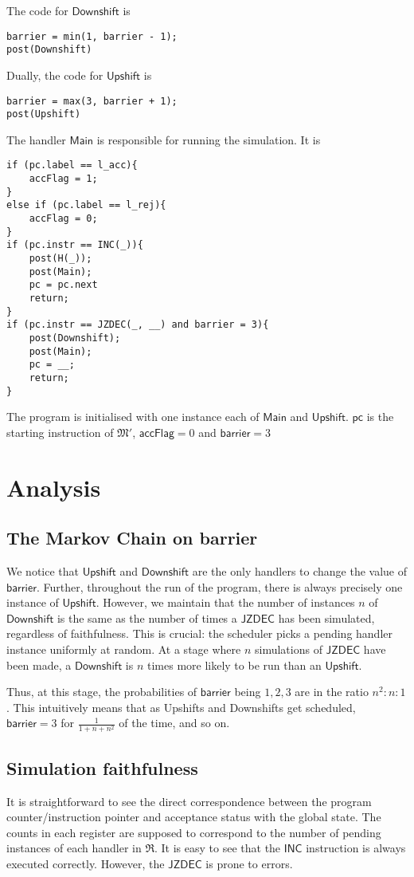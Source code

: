 \documentclass{article}
\theoremstyle{remark}
\newcommand{\machine}{\mathfrak{M}}
\newcommand{\inc}{\mathsf{INC}}
\newcommand{\jzdec}{\mathsf{JZDEC}}
\newcommand{\pc}{\mathsf{pc}}
\newcommand{\main}{\mathsf{Main}}
\newcommand{\accflag}{\mathsf{accFlag}}
\newcommand{\barrier}{\mathsf{barrier}}
\newcommand{\upshift}{\mathsf{Upshift}}
\newcommand{\downshift}{\mathsf{Downshift}}
\begin{document}
The code for $\downshift$ is
\begin{lstlisting}
barrier = min(1, barrier - 1);
post(Downshift)
\end{lstlisting}

Dually, the code for $\upshift$ is
\begin{lstlisting}
barrier = max(3, barrier + 1);
post(Upshift)
\end{lstlisting}

The handler $\main$ is responsible for running the simulation. It is 
\begin{lstlisting}
if (pc.label == l_acc){
	accFlag = 1;
}
else if (pc.label == l_rej){
	accFlag = 0;
}
if (pc.instr == INC(_)){
	post(H(_));
	post(Main);
	pc = pc.next
	return;
}
if (pc.instr == JZDEC(_, __) and barrier = 3){
	post(Downshift);
	post(Main);
	pc = __;
	return;
}
\end{lstlisting}

The program is initialised with one instance each of $\main$ and $\upshift$. $\pc$ is the starting instruction of $\machine'$, $\accflag= 0$ and $\barrier = 3$

\section{Analysis}
\subsection{The Markov Chain on barrier}
We notice that $\upshift$ and $\downshift$ are the only handlers to change the value of $\barrier$. Further, throughout the run of the program, there is always precisely one instance of $\upshift$. However, we maintain that the number of instances $n$ of $\downshift$ is the same as the number of times a $\jzdec$ has been simulated, regardless of faithfulness. This is crucial: the scheduler picks a pending handler instance uniformly at random. At a stage where $n$ simulations of $\jzdec$ have been made, a $\downshift$ is $n$ times more likely to be run than an $\upshift$.

Thus, at this stage, the probabilities of $\barrier$ being $1, 2, 3$ are in the ratio $n^2: n: 1$. This intuitively means that as Upshifts and Downshifts get scheduled, $\barrier = 3$ for $\frac{1}{1+n+n^2}$ of the time, and so on. 

\subsection{Simulation faithfulness}
It is straightforward to see the direct correspondence between the program counter/instruction pointer and acceptance status with the global state. The counts in each register are supposed to correspond to the number of pending instances of each handler in $\mathfrak{R}$. It is easy to see that the $\inc$ instruction is always executed correctly. However, the $\jzdec$ is prone to errors. 
\end{document}

